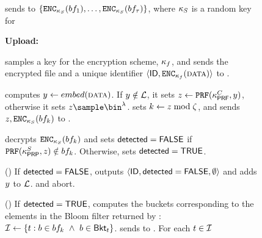 \begin{figure}
{\begin{minipage}[t]{\textwidth}


\item \label{pre:encrypt_filter} \server sends to \client $\{\encrypt[\bloomFilterKey](\bloomFilter[1]), \dots, \encrypt[\bloomFilterKey](\bloomFilter[\numBuckets])\}$, where  $\kappa_{S}$ is a random key for \encryptionScheme

\protocolStepListEnd


\smallskip\noindent\textbf{Upload:} 



\item \client samples a key for the encryption scheme, $\kappa_{f}$, and sends the encrypted file and a unique identifier $\langle \genericFileID, \encrypt[\fileKey](\clientData)\rangle$ to \server. 

\item \label{upload:bloom_filter_idx} \client computes $\genericCInputElmt \assign \contentHash(\clientData)$. If $\genericCInputElmt \notin \prevHashList$, it sets $\genericCInputElmtPRFEval \assign \prf(\prfKeyClient, \genericCInputElmt)$, otherwise it sets $\genericCInputElmtPRFEval \getsr \bin^{\secParam}$. \client sets $k \gets z \bmod \zeta$, and sends $\genericCInputElmtPRFEval, \encrypt[\bloomFilterKey](\bloomFilter[\bloomFilterIdx])$ to \server. 

\item \label{upload:fast_path_1} \server decrypts $\encrypt[\bloomFilterKey](\bloomFilter[\bloomFilterIdx])$ and sets $\mathsf{detected} = \mathsf{FALSE}$ if $\prf(\prpKeyServer,\genericCInputElmtPRFEval) \notin \bloomFilter[\bloomFilterIdx]$. Otherwise, \server sets $\mathsf{detected} = \mathsf{TRUE}$. 


\item \label{upload:fast_path_2} () If $\mathsf{detected} = \mathsf{FALSE}$, \server outputs $\langle \mathsf{ID}, \mathsf{detected} = \mathsf{FALSE}, \emptyset \rangle$ and \client adds $\genericCInputElmt$ to $\mathcal{L}$. \server and \client abort. 

\item () If $\mathsf{detected} = \mathsf{TRUE}$, \server computes the buckets corresponding to the elements in the Bloom filter returned by \client: $\bucketIDSet \assign \{ \bucketIdx: \genericBlocklistElmt \in \bloomFilter[\bloomFilterIdx] ~\land ~\genericBlocklistElmt \in \bucket{\bucketIdx}\}$. \server sends \bucketIDSet to \client.  For each $t \in \mathcal{I}$


\end{minipage}}
\end{figure}
